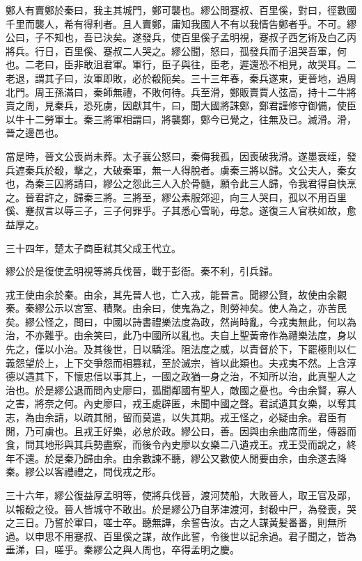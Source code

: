 鄭人有賣鄭於秦曰，我主其城門，鄭可襲也。繆公問蹇叔、百里傒，對曰，徑數國千里而襲人，希有得利者。且人賣鄭，庸知我國人不有以我情告鄭者乎。不可。繆公曰，子不知也，吾已決矣。遂發兵，使百里傒子孟明視，蹇叔子西乞術及白乙丙將兵。行日，百里傒、蹇叔二人哭之。繆公聞，怒曰，孤發兵而子沮哭吾軍，何也。二老曰，臣非敢沮君軍。軍行，臣子與往，臣老，遲還恐不相見，故哭耳。二老退，謂其子曰，汝軍即敗，必於殽阨矣。三十三年春，秦兵遂東，更晉地，過周北門。周王孫滿曰，秦師無禮，不敗何待。兵至滑，鄭販賣賈人弦高，持十二牛將賣之周，見秦兵，恐死虜，因獻其牛，曰，聞大國將誅鄭，鄭君謹修守御備，使臣以牛十二勞軍士。秦三將軍相謂曰，將襲鄭，鄭今已覺之，往無及已。滅滑。滑，晉之邊邑也。

當是時，晉文公喪尚未葬。太子襄公怒曰，秦侮我孤，因喪破我滑。遂墨衰绖，發兵遮秦兵於殽，擊之，大破秦軍，無一人得脫者。虜秦三將以歸。文公夫人，秦女也，為秦三囚將請曰，繆公之怨此三人入於骨髓，願令此三人歸，令我君得自快烹之。晉君許之，歸秦三將。三將至，繆公素服郊迎，向三人哭曰，孤以不用百里傒、蹇叔言以辱三子，三子何罪乎。子其悉心雪恥，毋怠。遂復三人官秩如故，愈益厚之。

三十四年，楚太子商臣弒其父成王代立。

繆公於是復使孟明視等將兵伐晉，戰于彭衙。秦不利，引兵歸。

戎王使由余於秦。由余，其先晉人也，亡入戎，能晉言。聞繆公賢，故使由余觀秦。秦繆公示以宮室、積聚。由余曰，使鬼為之，則勞神矣。使人為之，亦苦民矣。繆公怪之，問曰，中國以詩書禮樂法度為政，然尚時亂，今戎夷無此，何以為治，不亦難乎。由余笑曰，此乃中國所以亂也。夫自上聖黃帝作為禮樂法度，身以先之，僅以小治。及其後世，日以驕淫。阻法度之威，以責督於下，下罷極則以仁義怨望於上，上下交爭怨而相篡弒，至於滅宗，皆以此類也。夫戎夷不然。上含淳德以遇其下，下懷忠信以事其上，一國之政猶一身之治，不知所以治，此真聖人之治也。於是繆公退而問內史廖曰，孤聞鄰國有聖人，敵國之憂也。今由余賢，寡人之害，將奈之何。內史廖曰，戎王處辟匿，未聞中國之聲。君試遺其女樂，以奪其志，為由余請，以疏其閒，留而莫遣，以失其期。戎王怪之，必疑由余。君臣有閒，乃可虜也。且戎王好樂，必怠於政。繆公曰，善。因與由余曲席而坐，傳器而食，問其地形與其兵勢盡察，而後令內史廖以女樂二八遺戎王。戎王受而說之，終年不還。於是秦乃歸由余。由余數諫不聽，繆公又數使人閒要由余，由余遂去降秦。繆公以客禮禮之，問伐戎之形。

三十六年，繆公復益厚孟明等，使將兵伐晉，渡河焚船，大敗晉人，取王官及鄗，以報殽之役。晉人皆城守不敢出。於是繆公乃自茅津渡河，封殽中尸，為發喪，哭之三日。乃誓於軍曰，嗟士卒。聽無譁，余誓告汝。古之人謀黃髪番番，則無所過。以申思不用蹇叔、百里傒之謀，故作此誓，令後世以記余過。君子聞之，皆為垂涕，曰，嗟乎。秦繆公之與人周也，卒得孟明之慶。

